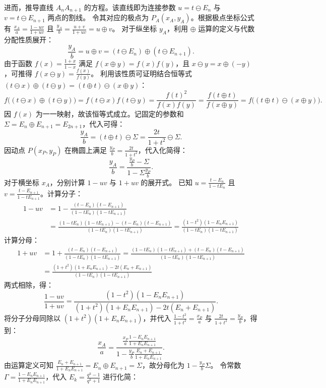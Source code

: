 \begin{solution}
进而，推导直线 $A_n A_{n+1}$ 的方程。该直线即为连接参数 $u = t \ominus E_n$ 与 $v = t \ominus E_{n+1}$ 两点的割线。
令其对应的极点为 $P_A(x_A, y_A)$。根据极点坐标公式有 $\frac{x_A}{a} = \frac{1-uv}{1+uv}$ 且 $\frac{y_A}{b} = \frac{u+v}{1+uv} = u \oplus v$。
对于纵坐标 $y_A$，利用 $\oplus$ 运算的定义与代数分配性质展开：
\[ \frac{y_A}{b} = u \oplus v = (t \ominus E_n) \oplus (t \ominus E_{n+1}). \]
由于函数 $f(x) = \frac{1+x}{1-x}$ 满足 $f(x \oplus y) = f(x)f(y)$，且 $x \ominus y = x \oplus (-y)$，可推得 $f(x \ominus y) = \frac{f(x)}{f(y)}$。
利用该性质可证明结合恒等式 $(t \ominus x) \oplus (t \ominus y) = (t \oplus t) \ominus (x \oplus y)$：
\[ f\big((t \ominus x) \oplus (t \ominus y)\big) = f(t \ominus x)f(t \ominus y) = \frac{f(t)^2}{f(x)f(y)} = \frac{f(t \oplus t)}{f(x \oplus y)} = f\big((t \oplus t) \ominus (x \oplus y)\big). \]
因 $f(x)$ 为一一映射，故该恒等式成立。记固定的参数和 $\Sigma = E_n \oplus E_{n+1} = E_{2n+1}$，代入可得：
\[ \frac{y_A}{b} = (t \oplus t) \ominus \Sigma = \frac{2t}{1+t^2} \ominus \Sigma. \]
因动点 $P(x_P, y_P)$ 在椭圆上满足 $\frac{y_P}{b} = \frac{2t}{1+t^2}$，代入化简得：
\[ \frac{y_A}{b} = \frac{\frac{y_P}{b} - \Sigma}{1 - \Sigma\frac{y_P}{b}}. \]
对于横坐标 $x_A$，分别计算 $1-uv$ 与 $1+uv$ 的展开式。
已知 $u = \frac{t-E_n}{1-tE_n}$ 且 $v = \frac{t-E_{n+1}}{1-tE_{n+1}}$。计算分子：
\begin{align*}
1-uv &= 1 - \frac{(t-E_n)(t-E_{n+1})}{(1-tE_n)(1-tE_{n+1})} \\
&= \frac{(1-tE_n)(1-tE_{n+1}) - (t-E_n)(t-E_{n+1})}{(1-tE_n)(1-tE_{n+1})} = \frac{(1-t^2)(1-E_n E_{n+1})}{(1-tE_n)(1-tE_{n+1})}
\end{align*}
计算分母：
\begin{align*}
1+uv &= 1 + \frac{(t-E_n)(t-E_{n+1})}{(1-tE_n)(1-tE_{n+1})} =\frac{(1-tE_n)(1-tE_{n+1}) + (t-E_n)(t-E_{n+1})}{(1-tE_n)(1-tE_{n+1})} \\&= \frac{(1+t^2)(1+E_n E_{n+1}) - 2t(E_n+E_{n+1})}{(1-tE_n)(1-tE_{n+1})}
\end{align*}
两式相除，得：
\[ \frac{1-uv}{1+uv} = \frac{(1-t^2)(1-E_n E_{n+1})}{(1+t^2)(1+E_n E_{n+1}) - 2t(E_n+E_{n+1})}. \]
将分子分母同除以 $(1+t^2)(1+E_n E_{n+1})$，并代入 $\frac{1-t^2}{1+t^2} = \frac{x_P}{a}$ 与 $\frac{2t}{1+t^2} = \frac{y_P}{b}$，得到：
\[ \frac{x_A}{a} = \frac{ \frac{x_P}{a} \frac{1-E_n E_{n+1}}{1+E_n E_{n+1}} }{ 1 - \frac{y_P}{b} \frac{E_n+E_{n+1}}{1+E_n E_{n+1}} }. \]
由运算定义可知 $\frac{E_n+E_{n+1}}{1+E_n E_{n+1}} = E_n \oplus E_{n+1} = \Sigma$，故分母化为 $1 - \frac{y_P}{b} \Sigma$。
令常数 $\Gamma = \frac{1-E_n E_{n+1}}{1+E_n E_{n+1}}$，代入 $E_k = \frac{q^k-1}{q^k+1}$ 进行化简：

\end{solution}
